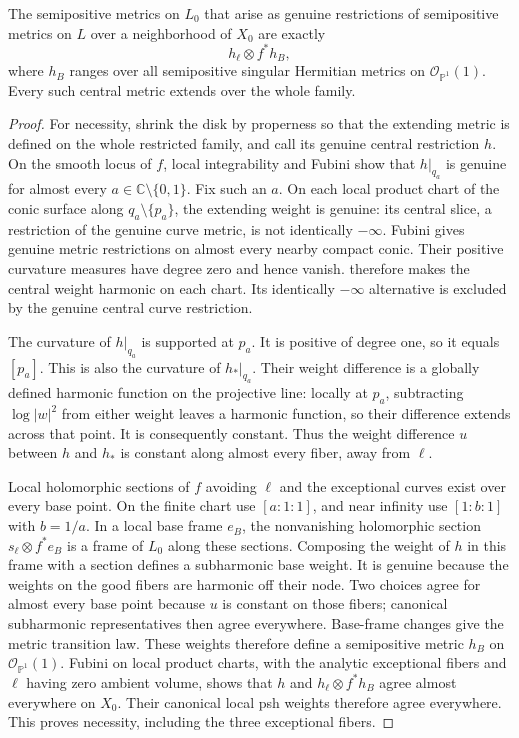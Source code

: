 \begin{theorem}\label{thm:four-point-metric-restriction-image}
The semipositive metrics on $L_0$ that arise as genuine restrictions of semipositive metrics on $L$ over a neighborhood of $X_0$ are exactly
\[
 h_\ell\otimes f^*h_B,
\]
where $h_B$ ranges over all semipositive singular Hermitian metrics on $\mathcal O_{\mathbb P^1}(1)$. Every such central metric extends over the whole family.
\end{theorem}
\begin{proof}
For necessity, shrink the disk by properness so that the extending metric is defined on the whole restricted family, and call its genuine central restriction $h$. On the smooth locus of $f$, local integrability and Fubini show that $h|_{q_a}$ is genuine for almost every $a\in\mathbb C\setminus\{0,1\}$. Fix such an $a$. On each local product chart of the conic surface along $q_a\setminus\{p_a\}$, the extending weight is genuine: its central slice, a restriction of the genuine curve metric, is not identically $-\infty$. Fubini gives genuine metric restrictions on almost every nearby compact conic. Their positive curvature measures have degree zero and hence vanish.  therefore makes the central weight harmonic on each chart. Its identically $-\infty$ alternative is excluded by the genuine central curve restriction.

The curvature of $h|_{q_a}$ is supported at $p_a$. It is positive of degree one, so it equals $[p_a]$. This is also the curvature of $h_*|_{q_a}$. Their weight difference is a globally defined harmonic function on the projective line: locally at $p_a$, subtracting $\log|w|^2$ from either weight leaves a harmonic function, so their difference extends across that point. It is consequently constant. Thus the weight difference $u$ between $h$ and $h_*$ is constant along almost every fiber, away from $\ell$.

Local holomorphic sections of $f$ avoiding $\ell$ and the exceptional curves exist over every base point. On the finite chart use $[a:1:1]$, and near infinity use $[1:b:1]$ with $b=1/a$. In a local base frame $e_B$, the nonvanishing holomorphic section $s_\ell\otimes f^*e_B$ is a frame of $L_0$ along these sections. Composing the weight of $h$ in this frame with a section defines a subharmonic base weight. It is genuine because the weights on the good fibers are harmonic off their node. Two choices agree for almost every base point because $u$ is constant on those fibers; canonical subharmonic representatives then agree everywhere. Base-frame changes give the metric transition law. These weights therefore define a semipositive metric $h_B$ on $\mathcal O_{\mathbb P^1}(1)$. Fubini on local product charts, with the analytic exceptional fibers and $\ell$ having zero ambient volume, shows that $h$ and $h_\ell\otimes f^*h_B$ agree almost everywhere on $X_0$. Their canonical local psh weights therefore agree everywhere. This proves necessity, including the three exceptional fibers.


\end{proof}
